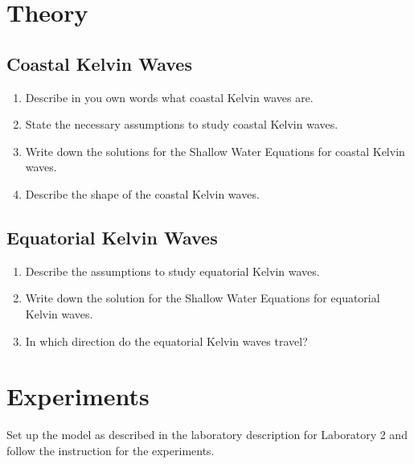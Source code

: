 \begin{question}
\section*{Theory}

\subsection*{Coastal Kelvin Waves}

\begin{enumerate}

\item Describe in you own words what coastal Kelvin waves are.

\item State the necessary assumptions to study coastal Kelvin waves.

\item Write down the solutions for the Shallow Water Equations for coastal Kelvin waves.

\item Describe the shape of the coastal Kelvin waves.

\end{enumerate}


\subsection*{Equatorial Kelvin Waves}

\begin{enumerate}

\item Describe the assumptions to study equatorial Kelvin waves.

\item Write down the solution for the Shallow Water Equations for equatorial Kelvin waves.

\item In which direction do the equatorial Kelvin waves travel?

\end{enumerate}



\section*{Experiments}

Set up the model as described in the laboratory description for Laboratory 2 and follow the instruction for the experiments.



\end{question}
